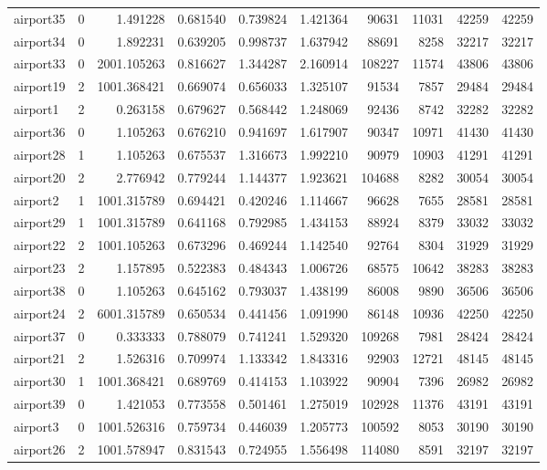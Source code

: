 \begin{longtable}{|l|r|r|r|r|r|r|r|r|r|}
airport35 & 0 & 1.491228 & 0.681540 & 0.739824 & 1.421364 & 90631 & 11031 & 42259 & 42259 \\
airport34 & 0 & 1.892231 & 0.639205 & 0.998737 & 1.637942 & 88691 & 8258 & 32217 & 32217 \\
airport33 & 0 & 2001.105263 & 0.816627 & 1.344287 & 2.160914 & 108227 & 11574 & 43806 & 43806 \\
airport19 & 2 & 1001.368421 & 0.669074 & 0.656033 & 1.325107 & 91534 & 7857 & 29484 & 29484 \\
airport1 & 2 & 0.263158 & 0.679627 & 0.568442 & 1.248069 & 92436 & 8742 & 32282 & 32282 \\
airport36 & 0 & 1.105263 & 0.676210 & 0.941697 & 1.617907 & 90347 & 10971 & 41430 & 41430 \\
airport28 & 1 & 1.105263 & 0.675537 & 1.316673 & 1.992210 & 90979 & 10903 & 41291 & 41291 \\
airport20 & 2 & 2.776942 & 0.779244 & 1.144377 & 1.923621 & 104688 & 8282 & 30054 & 30054 \\
airport2 & 1 & 1001.315789 & 0.694421 & 0.420246 & 1.114667 & 96628 & 7655 & 28581 & 28581 \\
airport29 & 1 & 1001.315789 & 0.641168 & 0.792985 & 1.434153 & 88924 & 8379 & 33032 & 33032 \\
airport22 & 2 & 1001.105263 & 0.673296 & 0.469244 & 1.142540 & 92764 & 8304 & 31929 & 31929 \\
airport23 & 2 & 1.157895 & 0.522383 & 0.484343 & 1.006726 & 68575 & 10642 & 38283 & 38283 \\
airport38 & 0 & 1.105263 & 0.645162 & 0.793037 & 1.438199 & 86008 & 9890 & 36506 & 36506 \\
airport24 & 2 & 6001.315789 & 0.650534 & 0.441456 & 1.091990 & 86148 & 10936 & 42250 & 42250 \\
airport37 & 0 & 0.333333 & 0.788079 & 0.741241 & 1.529320 & 109268 & 7981 & 28424 & 28424 \\
airport21 & 2 & 1.526316 & 0.709974 & 1.133342 & 1.843316 & 92903 & 12721 & 48145 & 48145 \\
airport30 & 1 & 1001.368421 & 0.689769 & 0.414153 & 1.103922 & 90904 & 7396 & 26982 & 26982 \\
airport39 & 0 & 1.421053 & 0.773558 & 0.501461 & 1.275019 & 102928 & 11376 & 43191 & 43191 \\
airport3 & 0 & 1001.526316 & 0.759734 & 0.446039 & 1.205773 & 100592 & 8053 & 30190 & 30190 \\
airport26 & 2 & 1001.578947 & 0.831543 & 0.724955 & 1.556498 & 114080 & 8591 & 32197 & 32197 \\

\end{longtable}
